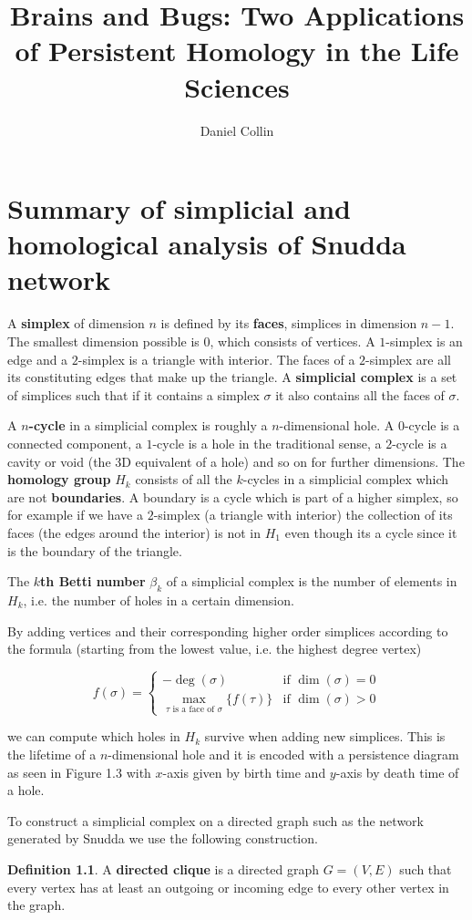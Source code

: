 \documentclass[oneside,a4paper,12pt, DIV=calc]{scrbook}
\author{Daniel Collin}
\title{Brains and Bugs: Two Applications of Persistent Homology in the Life Sciences}
\theoremstyle{definition}
\newtheorem{definition}{Definition}
\begin{document}
\chapter{Summary of simplicial and homological analysis of Snudda network}
A \textbf{simplex} of dimension $n$ is defined by its \textbf{faces}, simplices in dimension $n-1$. The smallest dimension possible is $0$, which consists of vertices. A $1$-simplex is an edge and a $2$-simplex is a triangle with interior. The faces of a $2$-simplex are all its constituting edges that make up the triangle. A \textbf{simplicial complex} is a set of simplices such that if it contains a simplex $\sigma$ it also contains all the faces of $\sigma$.

A \textbf{$n$-cycle} in a simplicial complex is roughly a $n$-dimensional hole. A $0$-cycle is a connected component, a $1$-cycle is a hole in the traditional sense, a $2$-cycle is a cavity or void (the 3D equivalent of a hole) and so on for further dimensions. The \textbf{homology group} $H_{k}$ consists of all the $k$-cycles in a simplicial complex which are not \textbf{boundaries}. A boundary is a cycle which is part of a higher simplex, so for example if we have a $2$-simplex (a triangle with interior) the collection of its faces (the edges around the interior) is not in $H_{1}$ even though its a cycle since it is the boundary of the triangle.

The \textbf{$k$th Betti number} $\beta_{k}$ of a simplicial complex is the number of elements in $H_{k}$, i.e. the number of holes in a certain dimension.

By adding vertices and their corresponding higher order simplices according to the formula (starting from the lowest value, i.e. the highest degree vertex)

\[
  f(\sigma) = \begin{cases}
    -\deg(\sigma) & \text{if } \dim(\sigma) = 0 \\
    \max_{\tau \text{ is a face of } \sigma} \{ f(\tau) \} & \text{if } \dim(\sigma) > 0
  \end{cases}
\]

we can compute which holes in $H_{k}$ survive when adding new simplices. This is the lifetime of a $n$-dimensional hole and it is encoded with a persistence diagram as seen in Figure 1.3 with $x$-axis given by birth time and $y$-axis by death time of a hole.

To construct a simplicial complex on a directed graph such as the network generated by Snudda we use the following construction.
\begin{definition}
  A \textbf{directed clique} is a directed graph $G=(V,E)$ such that every vertex has at least an outgoing or incoming edge to every other vertex in the graph. \end{definition}
\end{document}
